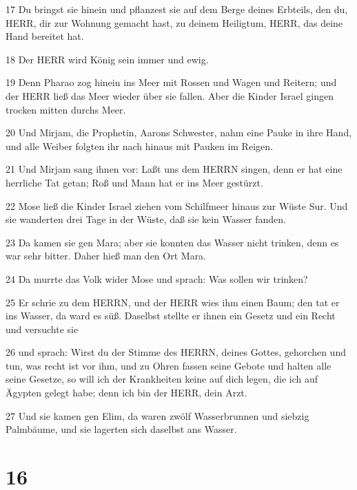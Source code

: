 \par 17 Du bringst sie hinein und pflanzest sie auf dem Berge deines Erbteils, den du, HERR, dir zur Wohnung gemacht hast, zu deinem Heiligtum, HERR, das deine Hand bereitet hat.
\par 18 Der HERR wird König sein immer und ewig.
\par 19 Denn Pharao zog hinein ins Meer mit Rossen und Wagen und Reitern; und der HERR ließ das Meer wieder über sie fallen. Aber die Kinder Israel gingen trocken mitten durchs Meer.
\par 20 Und Mirjam, die Prophetin, Aarons Schwester, nahm eine Pauke in ihre Hand, und alle Weiber folgten ihr nach hinaus mit Pauken im Reigen.
\par 21 Und Mirjam sang ihnen vor: Laßt uns dem HERRN singen, denn er hat eine herrliche Tat getan; Roß und Mann hat er ins Meer gestürzt.
\par 22 Mose ließ die Kinder Israel ziehen vom Schilfmeer hinaus zur Wüste Sur. Und sie wanderten drei Tage in der Wüste, daß sie kein Wasser fanden.
\par 23 Da kamen sie gen Mara; aber sie konnten das Wasser nicht trinken, denn es war sehr bitter. Daher hieß man den Ort Mara.
\par 24 Da murrte das Volk wider Mose und sprach: Was sollen wir trinken?
\par 25 Er schrie zu dem HERRN, und der HERR wies ihm einen Baum; den tat er ins Wasser, da ward es süß. Daselbst stellte er ihnen ein Gesetz und ein Recht und versuchte sie
\par 26 und sprach: Wirst du der Stimme des HERRN, deines Gottes, gehorchen und tun, was recht ist vor ihm, und zu Ohren fassen seine Gebote und halten alle seine Gesetze, so will ich der Krankheiten keine auf dich legen, die ich auf Ägypten gelegt habe; denn ich bin der HERR, dein Arzt.
\par 27 Und sie kamen gen Elim, da waren zwölf Wasserbrunnen und siebzig Palmbäume, und sie lagerten sich daselbst ans Wasser.

\chapter{16}

